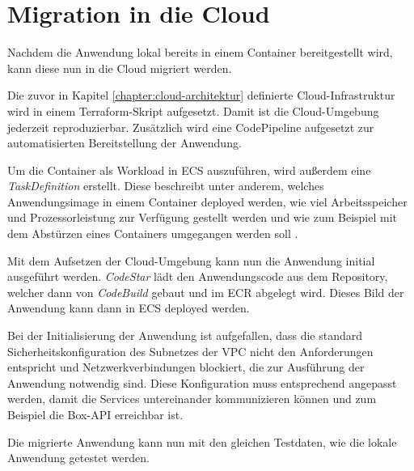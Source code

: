 \section{Migration in die Cloud}

Nachdem die Anwendung lokal bereits in einem Container bereitgestellt wird, kann diese nun in die Cloud migriert werden.

Die zuvor in Kapitel \ref{chapter:cloud-architektur} definierte Cloud-Infrastruktur wird in einem \gls{Terraform}-Skript aufgesetzt. Damit ist die Cloud-Umgebung jederzeit reproduzierbar. Zusätzlich wird eine CodePipeline aufgesetzt zur automatisierten Bereitstellung der Anwendung.

Um die Container als Workload in ECS auszuführen, wird außerdem eine \textit{TaskDefinition} erstellt. Diese beschreibt unter anderem, welches Anwendungsimage in einem Container deployed werden, wie viel Arbeitsspeicher und Prozessorleistung zur Verfügung gestellt werden und wie zum Beispiel mit dem Abstürzen eines Containers umgegangen werden soll \cite[Vgl.][]{AWSECS}.

Mit dem Aufsetzen der Cloud-Umgebung kann nun die Anwendung initial ausgeführt werden. \textit{CodeStar} lädt den Anwendungscode aus dem \gls{Repository}, welcher dann von \textit{CodeBuild} gebaut und im \ac{ECR} abgelegt wird. Dieses Bild der Anwendung kann dann in \ac{ECS} deployed werden.

Bei der Initialisierung der Anwendung ist aufgefallen, dass die standard Sicherheitskonfiguration des Subnetzes der \ac{VPC} nicht den Anforderungen entspricht und Netzwerkverbindungen blockiert, die zur Ausführung der Anwendung notwendig sind. Diese Konfiguration muss entsprechend angepasst werden, damit die Services untereinander kommunizieren können und zum Beispiel die \gls{Box}-\ac{API} erreichbar ist.

Die migrierte Anwendung kann nun mit den gleichen Testdaten, wie die lokale Anwendung getestet werden.


